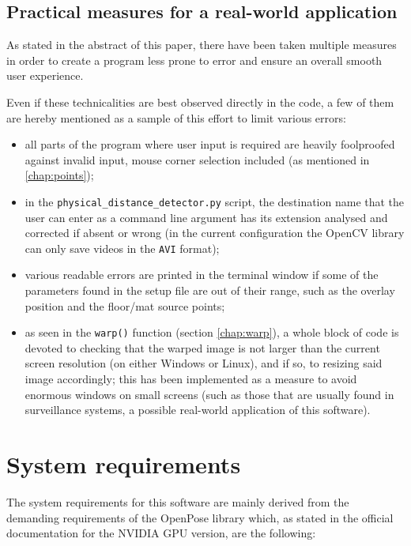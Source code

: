 \documentclass[12pt]{article}
\begin{document}

\subsection{Practical measures for a real-world application}
\label{chap:realworld}
As stated in the abstract of this paper, there have been taken multiple measures in order to create a program less prone to error and ensure an overall smooth user experience.

Even if these technicalities are best observed directly in the code, a few of them are hereby mentioned as a sample of this effort to limit various errors:
\begin{itemize}
    \item all parts of the program where user input is required are heavily foolproofed against invalid input, mouse corner selection included (as mentioned in \ref{chap:points});
    \item in the \lstinline{physical_distance_detector.py} script, the destination name that the user can enter as a command line argument has its extension analysed and corrected if absent or wrong (in the current configuration the OpenCV library can only save videos in the \lstinline{AVI} format);
    \item various readable errors are printed in the terminal window if some of the parameters found in the setup file are out of their range, such as the overlay position and the floor/mat source points;
    \item as seen in the \lstinline{warp()} function (section \ref{chap:warp}), a whole block of code is devoted to checking that the warped image is not larger than the current screen resolution (on either Windows or Linux), and if so, to resizing said image accordingly; this has been implemented as a measure to avoid enormous windows on small screens (such as those that are usually found in surveillance systems, a possible real-world application of this software).
\end{itemize}



\section{System requirements}
\label{chap:requirements}
The system requirements for this software are mainly derived from the demanding requirements of the OpenPose library which, as stated in the official documentation for the NVIDIA GPU version, are the following\cite{opprereq}\cite{opreq}:
\end{document}
